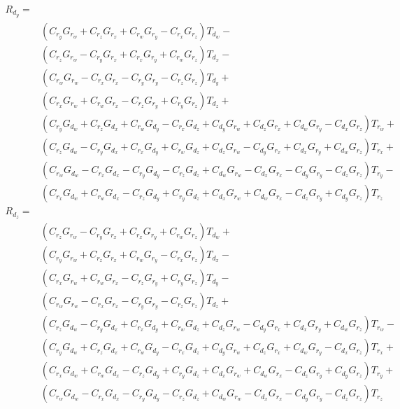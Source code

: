 \documentclass[12pt]{article}
\begin{document}
	\begin{equation}
		\begin{split}
			R_{d_y} = \\&
			(C_{r_y} G_{r_w} + 
			C_{r_z} G_{r_x} + C_{r_w} G_{r_y} - 
			C_{r_x} G_{r_z}) T_{d_w} -\\& (C_{r_z} G_{r_w} - 
			C_{r_y} G_{r_x} + C_{r_x} G_{r_y} + 
			C_{r_w} G_{r_z}) T_{d_x} -\\& (C_{r_w} G_{r_w} - 
			C_{r_x} G_{r_x} - C_{r_y} G_{r_y} - 
			C_{r_z} G_{r_z}) T_{d_y} +\\& (C_{r_x} G_{r_w} + 
			C_{r_w} G_{r_x} - C_{r_z} G_{r_y} + 
			C_{r_y} G_{r_z}) T_{d_z} + \\&(C_{r_y} G_{d_w} + 
			C_{r_z} G_{d_x} + C_{r_w} G_{d_y} - C_{r_x} G_{d_z} + 
			C_{d_y} G_{r_w} + C_{d_z} G_{r_x} + C_{d_w} G_{r_y} - 
			C_{d_x} G_{r_z}) T_{r_w} +\\& (C_{r_z} G_{d_w} - 
			C_{r_y} G_{d_x} + C_{r_x} G_{d_y} + C_{r_w} G_{d_z} + 
			C_{d_z} G_{r_w} - C_{d_y} G_{r_x} + C_{d_x} G_{r_y} + 
			C_{d_w} G_{r_z}) T_{r_x} +\\& (C_{r_w} G_{d_w} - 
			C_{r_x} G_{d_x} - C_{r_y} G_{d_y} - C_{r_z} G_{d_z} + 
			C_{d_w} G_{r_w} - C_{d_x} G_{r_x} - C_{d_y} G_{r_y} - 
			C_{d_z} G_{r_z}) T_{r_y} -\\& (C_{r_x} G_{d_w} + 
			C_{r_w} G_{d_x} - C_{r_z} G_{d_y} + C_{r_y} G_{d_z} + 
			C_{d_x} G_{r_w} + C_{d_w} G_{r_x} - C_{d_z} G_{r_y} + 
			C_{d_y} G_{r_z}) T_{r_z}
		\end{split}
	\end{equation}
	\begin{equation}
		\begin{split}
			R_{d_z} = \\&
			(C_{r_z} G_{r_w} - 
			C_{r_y} G_{r_x} + C_{r_x} G_{r_y} + 
			C_{r_w} G_{r_z}) T_{d_w} + \\&(C_{r_y} G_{r_w} + 
			C_{r_z} G_{r_x} + C_{r_w} G_{r_y} - 
			C_{r_x} G_{r_z}) T_{d_x} - \\&(C_{r_x} G_{r_w} + 
			C_{r_w} G_{r_x} - C_{r_z} G_{r_y} + 
			C_{r_y} G_{r_z}) T_{d_y} - \\&(C_{r_w} G_{r_w} - 
			C_{r_x} G_{r_x} - C_{r_y} G_{r_y} - 
			C_{r_z} G_{r_z}) T_{d_z} + \\&(C_{r_z} G_{d_w} - 
			C_{r_y} G_{d_x} + C_{r_x} G_{d_y} + C_{r_w} G_{d_z} + 
			C_{d_z} G_{r_w} - C_{d_y} G_{r_x} + C_{d_x} G_{r_y} + 
			C_{d_w} G_{r_z}) T_{r_w} -\\& (C_{r_y} G_{d_w} + 
			C_{r_z} G_{d_x} + C_{r_w} G_{d_y} - C_{r_x} G_{d_z} + 
			C_{d_y} G_{r_w} + C_{d_z} G_{r_x} + C_{d_w} G_{r_y} - 
			C_{d_x} G_{r_z}) T_{r_x} +\\& (C_{r_x} G_{d_w} + 
			C_{r_w} G_{d_x} - C_{r_z} G_{d_y} + C_{r_y} G_{d_z} + 
			C_{d_x} G_{r_w} + C_{d_w} G_{r_x} - C_{d_z} G_{r_y} + 
			C_{d_y} G_{r_z}) T_{r_y} +\\& (C_{r_w} G_{d_w} - 
			C_{r_x} G_{d_x} - C_{r_y} G_{d_y} - C_{r_z} G_{d_z} + 
			C_{d_w} G_{r_w} - C_{d_x} G_{r_x} - C_{d_y} G_{r_y} - 
			C_{d_z} G_{r_z}) T_{r_z}
		\end{split}
	\end{equation}
	
\end{document}
